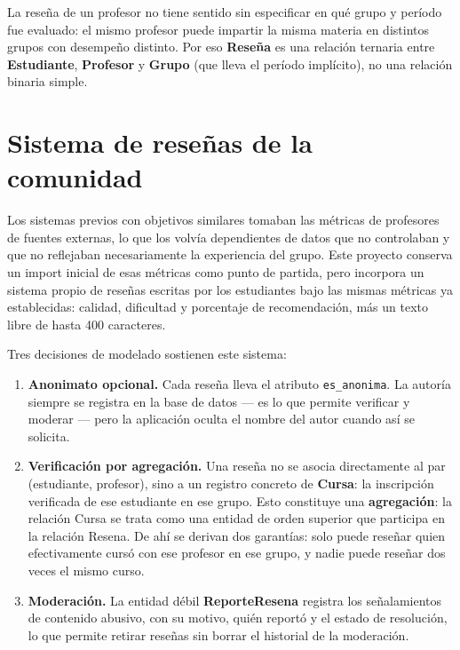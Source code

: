 \documentclass[11pt,letterpaper]{article}
\begin{document}
La reseña de un profesor no tiene sentido sin especificar en qué grupo y período fue evaluado: el mismo profesor puede impartir la misma materia en distintos grupos con desempeño distinto. Por eso \textbf{Reseña} es una relación ternaria entre \textbf{Estudiante}, \textbf{Profesor} y \textbf{Grupo} (que lleva el período implícito), no una relación binaria simple.

\section{Sistema de reseñas de la comunidad}

Los sistemas previos con objetivos similares tomaban las métricas de profesores de fuentes externas, lo que los volvía dependientes de datos que no controlaban y que no reflejaban necesariamente la experiencia del grupo. Este proyecto conserva un import inicial de esas métricas como punto de partida, pero incorpora un sistema propio de reseñas escritas por los estudiantes bajo las mismas métricas ya establecidas: calidad, dificultad y porcentaje de recomendación, más un texto libre de hasta 400 caracteres.

Tres decisiones de modelado sostienen este sistema:

\begin{enumerate}
  \item \textbf{Anonimato opcional.} Cada reseña lleva el atributo \texttt{es\_anonima}. La autoría siempre se registra en la base de datos --- es lo que permite verificar y moderar --- pero la aplicación oculta el nombre del autor cuando así se solicita.

  \item \textbf{Verificación por agregación.} Una reseña no se asocia directamente al par (estudiante, profesor), sino a un registro concreto de \textbf{Cursa}: la inscripción verificada de ese estudiante en ese grupo. Esto constituye una \textbf{agregación}: la relación Cursa se trata como una entidad de orden superior que participa en la relación Resena. De ahí se derivan dos garantías: solo puede reseñar quien efectivamente cursó con ese profesor en ese grupo, y nadie puede reseñar dos veces el mismo curso.

  \item \textbf{Moderación.} La entidad débil \textbf{ReporteResena} registra los señalamientos de contenido abusivo, con su motivo, quién reportó y el estado de resolución, lo que permite retirar reseñas sin borrar el historial de la moderación.
\end{enumerate}
\end{document}
